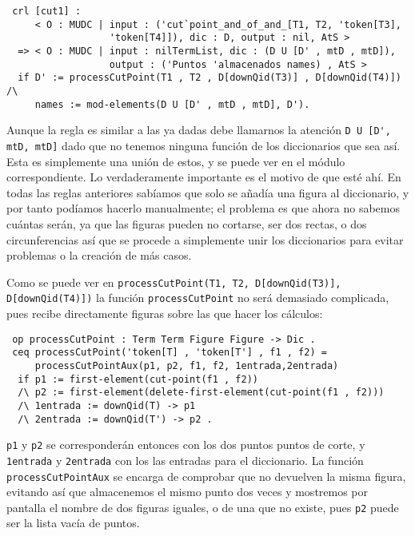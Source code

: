 {\codesize
\begin{verbatim}
 crl [cut1] :
     < O : MUDC | input : ('cut`point_and_of_and_[T1, T2, 'token[T3],
                  'token[T4]]), dic : D, output : nil, AtS >
  => < O : MUDC | input : nilTermList, dic : (D U [D' , mtD , mtD]),
                  output : ('Puntos 'almacenados names) , AtS >
  if D' := processCutPoint(T1 , T2 , D[downQid(T3)] , D[downQid(T4)]) /\
     names := mod-elements(D U [D' , mtD , mtD], D').
\end{verbatim}
}

Aunque la regla es similar a las ya dadas debe llamarnos la atención \verb"D U [D', mtD, mtD]" dado que no tenemos ninguna función de los diccionarios que sea así. Esta es simplemente una unión de estos, y se puede ver en el módulo correspondiente. Lo verdaderamente importante es el motivo de que esté ahí. En todas las reglas anteriores sabíamos que solo se añadía una figura al diccionario, y por tanto podíamos hacerlo manualmente; el problema es que ahora no sabemos cuántas serán, ya que las figuras pueden no cortarse, ser dos rectas, o dos circunferencias así que se procede a simplemente unir los diccionarios para evitar problemas o la creación de más casos.

Como se puede ver en \verb"processCutPoint(T1, T2, D[downQid(T3)], D[downQid(T4)])" la función \texttt{processCutPoint} no será demasiado complicada, pues recibe directamente figuras sobre las que hacer los cálculos: \par

{\codesize
\begin{verbatim}
 op processCutPoint : Term Term Figure Figure -> Dic .
 ceq processCutPoint('token[T] , 'token[T'] , f1 , f2) =
     processCutPointAux(p1, p2, f1, f2, 1entrada,2entrada)
  if p1 := first-element(cut-point(f1 , f2))
  /\ p2 := first-element(delete-first-element(cut-point(f1 , f2)))
  /\ 1entrada := downQid(T) -> p1
  /\ 2entrada := downQid(T') -> p2 .
\end{verbatim}
}

\texttt{p1} y \texttt{p2} se corresponderán entonces con los dos puntos puntos de corte, y \texttt{1entrada} y \texttt{2entrada} con los las entradas para el diccionario. La función \texttt{processCutPointAux} se encarga de comprobar que no devuelven la misma figura, evitando así que almacenemos el mismo punto dos veces y mostremos por pantalla el nombre de dos figuras iguales, o de una que no existe, pues \texttt{p2} puede ser la lista vacía de puntos. \par

